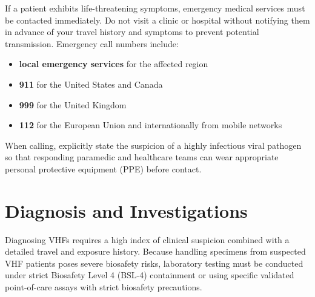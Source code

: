 If a patient exhibits life-threatening symptoms, emergency medical services must be contacted immediately. Do not visit a clinic or hospital without notifying them in advance of your travel history and symptoms to prevent potential transmission. Emergency call numbers include:
\begin{itemize}
\item \textbf{local emergency services} for the affected region
\item \textbf{911} for the United States and Canada
\item \textbf{999} for the United Kingdom
\item \textbf{112} for the European Union and internationally from mobile networks
\end{itemize}
When calling, explicitly state the suspicion of a highly infectious viral pathogen so that responding paramedic and healthcare teams can wear appropriate personal protective equipment (PPE) before contact.

\section*{Diagnosis and Investigations}
Diagnosing VHFs requires a high index of clinical suspicion combined with a detailed travel and exposure history. Because handling specimens from suspected VHF patients poses severe biosafety risks, laboratory testing must be conducted under strict Biosafety Level 4 (BSL-4) containment or using specific validated point-of-care assays with strict biosafety precautions.

